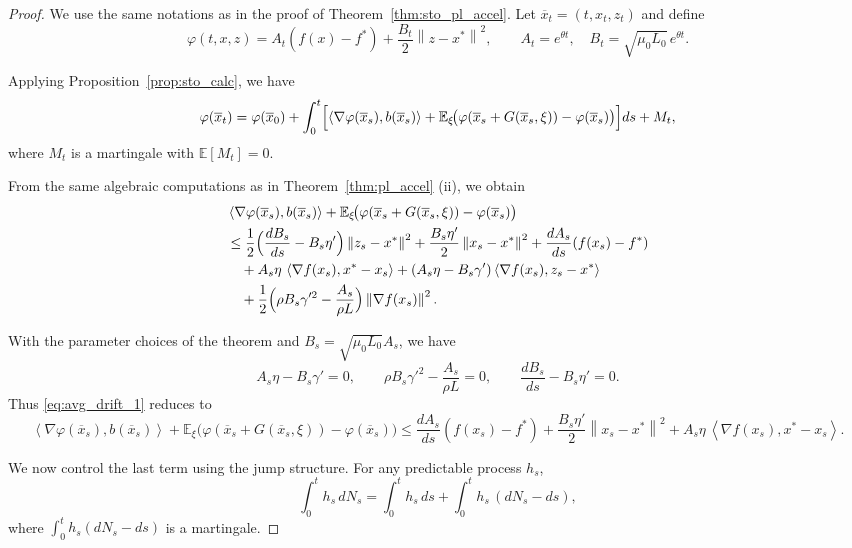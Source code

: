 \documentclass{article}
\newcommand{\E}[1]{\mathbb{E}\left[#1 \right]}
\newcommand{\norm}[1]{\left\lVert#1\right\rVert}
\newcommand{\dotprod}[1]{\left< #1\right>}
\theoremstyle{plain}
\theoremstyle{definition}
\theoremstyle{remark}
\begin{document}
\begin{proof}
We use the same notations as in the proof of Theorem~\ref{thm:sto_pl_accel}.
Let $\overline{x}_t=(t,x_t,z_t)$ and define
\[
\varphi(t,x,z)
=
A_t(f(x)-f^\ast)+\frac{B_t}{2}\norm{z-x^\ast}^2,
\qquad
A_t=e^{\theta t},
\quad
B_t=\sqrt{\mu_0L_0}\,e^{\theta t}.
\]

Applying Proposition~\ref{prop:sto_calc}, we have
\begin{equation}\label{eq:avg_prop_calc}
\varphi(\overline{x}_t)
=
\varphi(\overline{x}_0)
+
\int_0^t
\Bigl[
\dotprod{\nabla \varphi(\overline{x}_s),b(\overline{x}_s)}
+
\mathbb{E}_{\xi}\!\bigl(
\varphi(\overline{x}_s+G(\overline{x}_s,\xi))-\varphi(\overline{x}_s)
\bigr)
\Bigr]ds
+M_t,
\end{equation}
where $M_t$ is a martingale with $\E{M_t}=0$.

From the same algebraic computations as in
Theorem~\ref{thm:pl_accel} (ii),
we obtain
\begin{align}\label{eq:avg_drift_1}
&\dotprod{\nabla \varphi(\overline{x}_s),b(\overline{x}_s)}
+
\mathbb{E}_{\xi}\!\bigl(
\varphi(\overline{x}_s+G(\overline{x}_s,\xi))-\varphi(\overline{x}_s)
\bigr)
\\
&\le
\frac{1}{2}\Bigl(\frac{dB_s}{ds}-B_s\eta'\Bigr)\norm{z_s-x^\ast}^2
+
\frac{B_s\eta'}{2}\norm{x_s-x^\ast}^2
+
\frac{dA_s}{ds}(f(x_s)-f^\ast)
\nonumber\\
&\quad
+
A_s\eta\,\dotprod{\nabla f(x_s),x^\ast-x_s}
+
(A_s\eta-B_s\gamma')\dotprod{\nabla f(x_s),z_s-x^\ast}
\nonumber\\
&\quad
+
\frac12\Bigl(\rho B_s\gamma'^2-\frac{A_s}{\rho L}\Bigr)\norm{\nabla f(x_s)}^2.
\nonumber
\end{align}

With the parameter choices of the theorem and $B_s=\sqrt{\mu_0L_0}A_s$, we have
\[
A_s\eta-B_s\gamma'=0,
\qquad
\rho B_s\gamma'^2-\frac{A_s}{\rho L}=0,
\qquad
\frac{dB_s}{ds}-B_s\eta'=0.
\]
Thus \eqref{eq:avg_drift_1} reduces to
\begin{equation}\label{eq:avg_drift_2}
\dotprod{\nabla \varphi(\overline{x}_s),b(\overline{x}_s)}
+
\mathbb{E}_{\xi}\!\bigl(
\varphi(\overline{x}_s+G(\overline{x}_s,\xi))-\varphi(\overline{x}_s)
\bigr)
\le
\frac{dA_s}{ds}(f(x_s)-f^\ast)
+
\frac{B_s\eta'}{2}\norm{x_s-x^\ast}^2
+
A_s\eta\,\dotprod{\nabla f(x_s),x^\ast-x_s}.
\end{equation}

We now control the last term using the jump structure.
For any predictable process $h_s$,
\[
\int_0^t h_s\,dN_s
=
\int_0^t h_s\,ds
+
\int_0^t h_s\,(dN_s-ds),
\]
where $\int_0^t h_s(dN_s-ds)$ is a martingale.


\end{proof}
\end{document}
